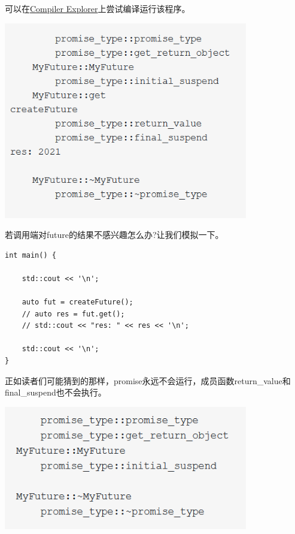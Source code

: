 可以在\href{https://godbolt.org/z/EejWcj}{Compiler Explorer}上尝试编译运行该程序。

\begin{center}
\includegraphics[width=0.8\textwidth]{content/3/chapter7/images/9.png}\\
\end{center}

若调用端对future的结果不感兴趣怎么办?让我们模拟一下。

\begin{lstlisting}[style=styleCXX]
int main() {
	
	std::cout << '\n';
	
	auto fut = createFuture();
	// auto res = fut.get();
	// std::cout << "res: " << res << '\n';
	
	std::cout << '\n';
}
\end{lstlisting}

正如读者们可能猜到的那样，promise永远不会运行，成员函数return\_value和final\_suspend也不会执行。

\begin{center}
\includegraphics[width=0.8\textwidth]{content/3/chapter7/images/10.png}\\
\end{center}

